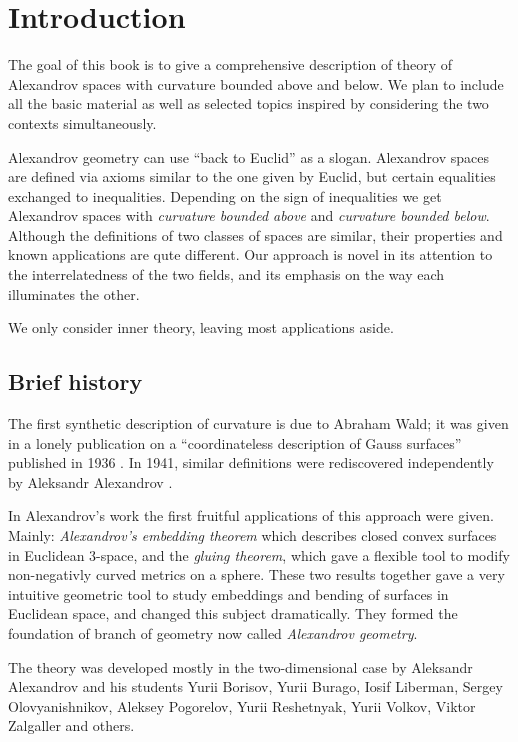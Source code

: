 \chapter*{Introduction}

The goal of this book is to give a comprehensive description of theory of Alexandrov spaces 
with curvature bounded above and below.
We plan to include all the basic material as well as selected topics inspired by considering the two contexts simultaneously.

Alexandrov geometry can use ``back to Euclid'' as a slogan.
Alexandrov spaces are defined via axioms similar to the one given by Euclid,
but certain  equalities exchanged to inequalities. 
Depending on the sign of inequalities we get Alexandrov spaces with \emph{curvature bounded above} and \emph{curvature bounded below}.
Although the definitions of two classes of spaces are similar, their properties and known applications are qute different.
Our approach is novel in its attention to the interrelatedness of the two fields, and its emphasis on the way each illuminates the other.

We only consider inner theory, leaving most applications aside.


\section*{Brief history}

The first synthetic description of curvature is due to Abraham Wald; 
it was given in a lonely publication on a ``coordinateless description of Gauss surfaces'' published in 1936 \cite{wald}.
In 1941, similar definitions were rediscovered independently by Aleksandr Alexandrov \cite{alexandrov:def}.

In Alexandrov's work the first fruitful applications of this approach were given.
Mainly: \emph{Alexandrov's embedding theorem} which describes closed convex surfaces in Euclidean 3-space,
and the \emph{gluing theorem}, which gave a flexible tool to modify non-negativly curved metrics on a sphere.
These two results together gave  a very intuitive geometric tool to study embeddings and bending of surfaces in Euclidean space, and changed this subject dramatically.
They formed the foundation of branch of geometry now called \emph{Alexandrov geometry}.


The theory was developed mostly in the two-dimensional case 
by Aleksandr Alexandrov
and his students  
Yurii  Borisov,
Yurii  Burago,
Iosif  Liberman,
Sergey  Olovyanishnikov,
Aleksey  Pogorelov,
Yurii  Reshetnyak,
Yurii  Volkov,
Viktor  Zalgaller and others.

